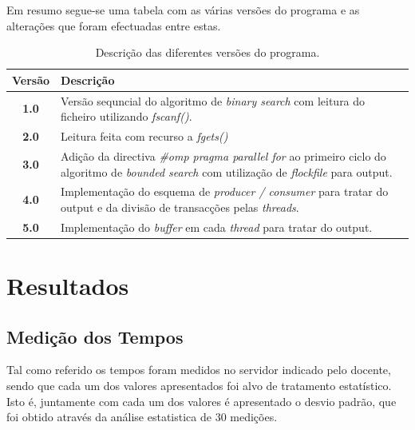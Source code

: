 \documentclass[a4paper]{article}
\begin{document}
Em resumo segue-se uma tabela com as várias versões do programa e as alterações que foram efectuadas entre estas.
\begin{table}[H]
	\begin{tabular}{| c | p{12cm} |} \hline
		\textbf{Versão}	&	\textbf{Descrição}	\\	\hline
		\textbf{1.0}	&	Versão sequncial do algoritmo de \textit{binary search} com leitura do ficheiro	utilizando \textit{fscanf()}.														\\	\hline
		\textbf{2.0}	&	Leitura feita com recurso a \textit{fgets()}																														\\	\hline
		\textbf{3.0}	&	Adição da directiva \textit{\#omp pragma parallel for} ao primeiro ciclo do algoritmo de \textit{bounded search} com utilização de \textit{flockfile} para output.	\\	\hline
		\textbf{4.0}	&	Implementação do esquema de \textit{producer / consumer} para tratar do output e da divisão de transacções pelas \textit{threads}.									\\	\hline
		\textbf{5.0}	&	Implementação do \textit{buffer} em cada \textit{thread} para tratar do output.																						\\	\hline
	\end{tabular}
	\caption{Descrição das diferentes versões do programa.}
\end{table}
\clearpage

\section{Resultados}
\subsection{Medição dos Tempos}
\indent \indent Tal como referido os tempos foram medidos no servidor indicado pelo docente, sendo que cada um dos valores apresentados foi alvo de tratamento estatístico. Isto é, juntamente com cada um dos valores é apresentado o desvio padrão, que foi obtido através da análise estatistica de 30 medições.
\end{document}
